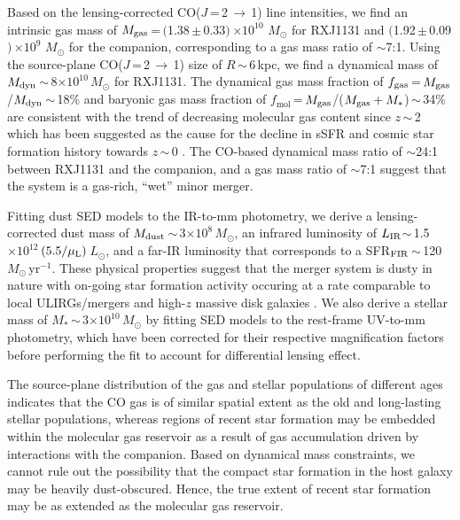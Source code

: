 \documentclass[]{emulateapj}
\newcommand{\Msun}{\mbox{$M_{\odot}$}\xspace}
\newcommand{\Lsun}{\mbox{$L_{\odot}$}\xspace}
\newcommand{\LIR}{\mbox{$L_{\rm IR}$}\xspace}
\newcommand{\rarr}{$\rightarrow$}
\newcommand{\bco}{\mbox{CO($J$\,=\,2\,\rarr\,1)}\xspace}
\newcommand{\sfrU}{\mbox{\Msun\,yr$^{-1}$}\xspace}
\newcommand{\E}[1]{\mbox{$\times10^{#1}$}}
\newcommand{\eq}{\,=\,}
\newcommand{\ssim}{\,$\sim$\,}
\newcommand{\pmm}{\,$\pm$\,}
\newcommand{\SF}{star formation\xspace}
\begin{document}
Based on the lensing-corrected \bco line intensities,
we find an intrinsic gas mass of $M_{\rm gas}$\,=\,$($1.38\pmm0.33$)$\,\E{10} \Msun
for RXJ1131
and $($1.92\pmm0.09$)$\,\E{9} \Msun for the companion,
corresponding to a gas mass ratio of $\sim$7:1.
Using the source-plane \bco size of $R$\ssim6\,kpc, we find a dynamical mass of $M_{\rm dyn}$\ssim8\E{10}\,\Msun for RXJ1131.
The dynamical gas mass fraction of $f_{\rm gas}$\eq$M_{\rm gas}$/$M_{\rm dyn}$\ssim18\% and baryonic gas mass fraction of
$f_\textrm{mol}$\eq$M_{\rm gas}$/($M_{\rm gas} + M_*$)\ssim34\% are consistent with the trend of decreasing molecular gas
content since $z$\ssim2 \citep[e.g.,][;]{Lagos11a,Tacconi13a}
which has been suggested as the cause for the decline in sSFR and cosmic \SF history towards $z$\ssim0 \citep[e.g.,][]{Tacconi13a,CW13,Genzel15a}.
The CO-based dynamical mass ratio of $\sim$24:1
between RXJ1131 and the companion, and a gas mass ratio of $\sim$7:1
suggest that the system is a gas-rich, ``wet'' minor merger.

Fitting dust SED models to the IR-to-mm photometry, we derive
a lensing-corrected dust mass of $M_{\rm dust}$\ssim3\E{8}\,\Msun,
an infrared luminosity of \LIR$\sim$\,1.5\E{12}\,$(5.5/\mu_{\rm L})$\,\Lsun,
and a far-IR luminosity that corresponds to a SFR$_{\rm FIR}$\ssim120\,\sfrU.
These physical properties suggest that the merger system is dusty in nature with on-going \SF activity occuring
at a rate comparable to local ULIRGs/mergers and high-$z$ massive disk galaxies \citep{dacunha10a, Daddi10a}.
We also derive a stellar mass of $M_{*}$\ssim3\E{10}\,\Msun by fitting SED models to the
rest-frame UV-to-mm photometry, which have been corrected for their respective magnification factors before performing the fit to account for differential lensing effect.

The source-plane distribution of the gas and stellar populations of different ages
indicates that the CO gas is of similar spatial extent as the old and long-lasting stellar populations,
whereas regions of recent \SF may be embedded within the molecular gas reservoir as a result of
gas accumulation driven by interactions with the companion.
Based on dynamical mass constraints, we cannot rule out the possibility that the
compact \SF in the host galaxy
may be heavily dust-obscured.
Hence, the true extent of recent \SF may be as extended as the molecular gas
reservoir.
\end{document}

